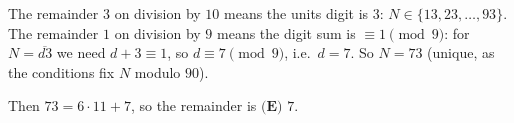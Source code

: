 The remainder $3$ on division by $10$ means the units digit is $3$: $N\in\{13,23,\ldots,93\}$. The remainder $1$ on division by $9$ means the digit sum is $\equiv1\pmod9$: for $N=\overline{d3}$ we need $d+3\equiv1$, so $d\equiv7\pmod 9$, i.e.\ $d=7$. So $N=73$ (unique, as the conditions fix $N$ modulo $90$).

Then $73=6\cdot11+7$, so the remainder is $\boxed{\textbf{(E) }7}$.
